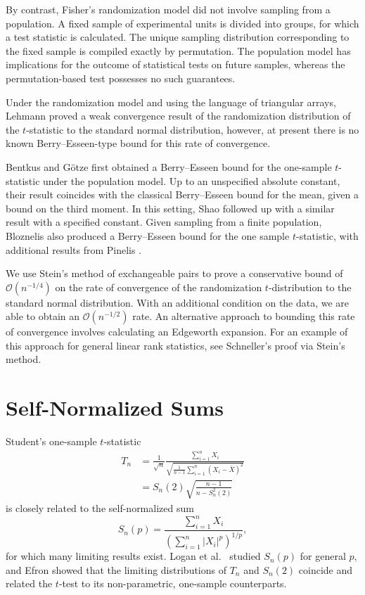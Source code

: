 By contrast, Fisher's randomization model \cite{fisher1935design} did
not involve sampling from a population.  A fixed sample of
experimental units is divided into groups, for which a test statistic
is calculated.  The unique sampling distribution corresponding to the
fixed sample is compiled exactly by permutation.  The population model
has implications for the outcome of statistical tests on future
samples, whereas the permutation-based test possesses no such
guarantees.

Under the randomization model and using the language of triangular
arrays, Lehmann \cite{lehmann1999elements} proved a weak convergence
result of the randomization distribution of the $t$-statistic to the
standard normal distribution, however, at present there is no known
Berry--Esseen-type bound for this rate of convergence.

Bentkus and G{\"o}tze \cite{bentkus1996berry} first obtained a
Berry--Esseen bound for the one-sample $t$-statistic under the
population model.  Up to an unspecified absolute constant, their result coincides
with the classical Berry--Esseen bound for the mean, given a bound on
the third moment.  In this setting, Shao \cite{shao2005explicit}
followed up with a similar result with a specified constant.  Given
sampling from a finite population, Bloznelis \cite{bloznelis1999berry}
also produced a Berry--Esseen bound for the one sample $t$-statistic,
with additional results from Pinelis \cite{pinelis2011berry}.

We use Stein's method of exchangeable pairs to prove a conservative
bound of $\mathcal{O}(n^{-1/4})$ on the rate of convergence of the randomization
$t$-distribution to the standard normal distribution.  With an
additional condition on the data, we are able to obtain an
$\mathcal{O}(n^{-1/2})$ rate.  An alternative approach to bounding
this rate of convergence involves calculating an Edgeworth expansion.
For an example of this approach for general linear rank statistics,
see Schneller's \cite{MR1015140} proof via Stein's method.

\section{Self-Normalized Sums}
Student's one-sample $t$-statistic
\begin{align*}
  T_n &= \frac{1}{\sqrt{n}} \frac{\sum_{i=1}^n X_i}{\sqrt{\frac{1}{n-1} \sum_{i=1}^n(X_i - \bar{X})^2}} \\
  &= S_n(2) \sqrt{\frac{n-1}{n-S_n^2(2)}}
\end{align*}
is closely related to the self-normalized sum
\begin{equation*}
  S_n(p) = \frac{\sum_{i=1}^n X_i}{\left ( \sum_{i=1}^n|X_i|^p \right )^{1/p}},
\end{equation*}
for which many limiting results exist.  Logan et al.\
\cite{logan1973limit} studied $S_n(p)$ for general $p$, and
Efron \cite{efron1969student} showed that the limiting distributions of
$T_n$ and $S_n(2)$ coincide and related the $t$-test to its
non-parametric, one-sample counterparts.


